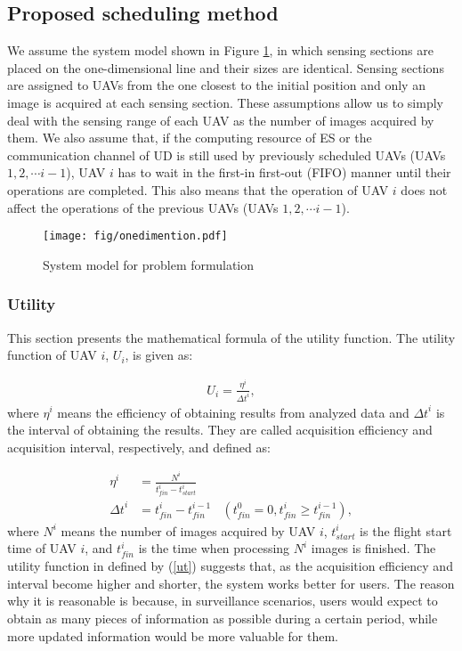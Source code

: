\documentclass{ieeeaccess}
\begin{document}
\subsection{Proposed scheduling method}\label{math}
We assume the system model shown in Figure \ref{model1.5}, in which sensing sections are placed on the one-dimensional line and their sizes are identical.
%
Sensing sections are assigned to UAVs from the one closest to the initial position and only an image is acquired at each sensing section.
%
These assumptions allow us to simply deal with the sensing range of each UAV as the number of images acquired by them.
%
We also assume that, if the computing resource of ES or the communication channel of UD is still used by previously scheduled UAVs (UAVs $1, 2, \cdots i-1$), UAV $i$ has to wait in the first-in first-out (FIFO) manner until their operations are completed.
%
This also means that the operation of UAV $i$ does not affect the operations of the previous UAVs (UAVs $1, 2, \cdots i-1$).

\begin{figure}[t]
\begin{center}
\texttt{[image: fig/onedimention.pdf]}
\caption{System model for problem formulation}
\label{model1.5}
\end{center}
\end{figure}

\subsubsection{Utility}\label{to}
This section presents the mathematical formula of the utility function.
%
The utility function of UAV $i$, $U_i$, is given as:

\begin{align}
U_i = \frac{\eta^i}{{\Delta{t}}^i}, \label{ut}
\end{align}
where $\eta^i$ means the efficiency of obtaining results from analyzed data and ${\Delta{t}}^i$ is the interval of obtaining the results.
%
They are called acquisition efficiency and acquisition interval, respectively, and defined as:

\begin{align}
\eta^i&=\frac{N^i}{{t_{fin}^i}-{t_{start}^i}} \label{f1}\\
{\Delta{t}}^i &= {t_{fin}^i}-t_{fin}^{i-1}~~~~(t_ {fin}^0=0, {t_{fin}^i}\geq{t_{fin}^{i-1}}), \label{f2}
\end{align}
where $N^i$ means the number of images acquired by UAV $i$, $t_{start}^i$ is the flight start time of UAV $i$, and $t_{fin}^i$ is the time when processing $N^i$ images is finished.
%
The utility function in defined by (\ref{ut}) suggests that, as the acquisition efficiency and interval become higher and shorter, the system works better for users.
%
The reason why it is reasonable is because, in surveillance scenarios, users would expect to obtain as many pieces of information as possible during a certain period, while more updated information would be more valuable for them.
\end{document}
